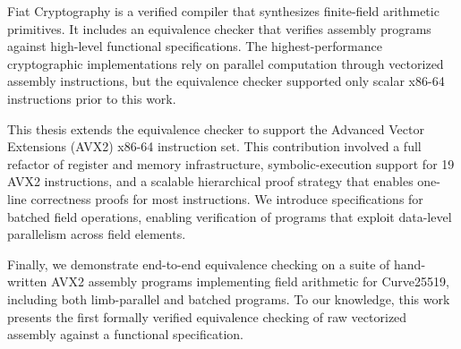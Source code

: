%
%

Fiat Cryptography is a verified compiler that synthesizes finite-field arithmetic primitives. 
It includes an equivalence checker that verifies assembly programs against high-level functional specifications.
The highest-performance cryptographic implementations rely on parallel computation through vectorized assembly instructions, but the equivalence checker supported only scalar x86-64 instructions prior to this work.

This thesis extends the equivalence checker to support the Advanced Vector Extensions (AVX2) x86-64 instruction set. This contribution involved a full refactor of register and memory infrastructure, symbolic-execution support for 19 AVX2 instructions, and a scalable hierarchical proof strategy that enables one-line correctness proofs for most instructions. We introduce specifications for batched field operations, enabling verification of programs that exploit data-level parallelism across field elements.

Finally, we demonstrate end-to-end equivalence checking on a suite of hand-written AVX2 assembly programs implementing field arithmetic for Curve25519, including both limb-parallel and batched programs. To our knowledge, this work presents the first formally verified equivalence checking of raw vectorized assembly against a functional specification.
